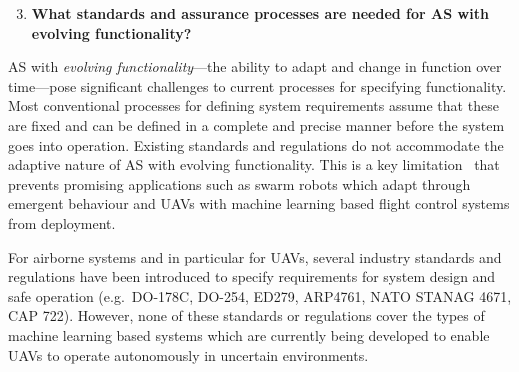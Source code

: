 \documentclass[sigconf,nonacm]{acmart}%
\begin{document}
	\begin{enumerate}[leftmargin=0.5cm]
		\setcounter{enumi}{2}
		\item \textbf{What standards and assurance processes are needed for AS with evolving functionality?}
	\end{enumerate}
	AS with \emph{evolving functionality}---the ability to adapt and change in function over time---pose significant challenges to current processes for specifying functionality. 
	Most conventional processes for defining system requirements assume that these are fixed and can be defined in a complete and precise manner before the system goes into operation. 
	Existing standards and regulations do not accommodate the adaptive nature of AS with evolving functionality. This is a key limitation~\cite{Fisher2020} that prevents promising applications such as swarm robots which adapt through emergent behaviour and UAVs with machine learning based flight control systems from deployment.
	
	
	For airborne systems and in particular for UAVs, several industry standards and regulations have been introduced to specify requirements for system design and safe operation (e.g.\ DO-178C, DO-254, ED279, ARP4761, NATO STANAG 4671, CAP 722). However, none of these standards or regulations cover the types of machine learning based systems which are currently being developed to enable UAVs to operate autonomously in uncertain environments.
	
\end{document}
